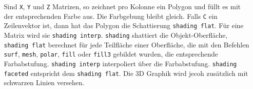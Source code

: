 \newline\newline
Sind \texttt{X}, \texttt{Y} und \texttt{Z} Matrizen, so zeichnet  pro Kolonne ein Polygon und füllt es mit der entsprechenden Farbe aus. Die Farbgebung bleibt gleich. Falls \texttt{C} ein Zeilenvektor ist, dann hat das Polygon die Schattierung \texttt{shading flat}. Für eine Matrix wird sie {\color{red}\texttt{shading interp}}. {\color{red}\texttt{shading}} shattiert die Objekt-Oberfläche, {\color{red}\texttt{shading flat}} berechnet für jede Teilfläche einer Oberfläche, die mit den Befehlen \texttt{surf}, \texttt{mesh}, \texttt{polar}, \texttt{fill} oder \texttt{fill3} gebildet wurden, die entsprechende Farbabstufung. {\color{red}\texttt{shading interp}} interpoliert über die Farbabstufung. {\color{red}\texttt{shading faceted}} entspricht dem {\color{red}\texttt{shading flat}}. Die 3D Graphik wird jecoh zusätzlich mit schwarzen Linien versehen.
